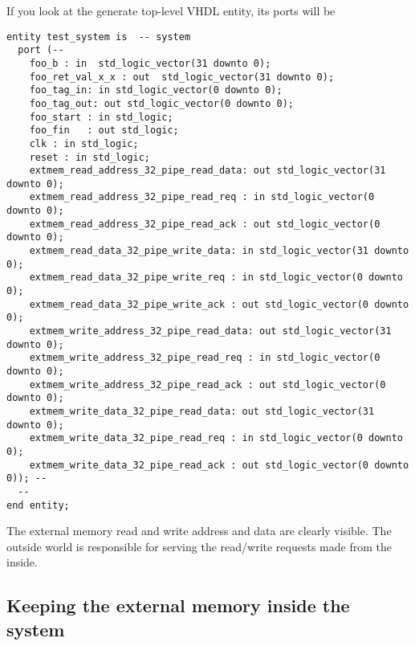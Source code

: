 \documentclass{article}
\begin{document}
If you look at the generate top-level VHDL entity, its ports
will be
\begin{verbatim}
entity test_system is  -- system
  port (--
    foo_b : in  std_logic_vector(31 downto 0);
    foo_ret_val_x_x : out  std_logic_vector(31 downto 0);
    foo_tag_in: in std_logic_vector(0 downto 0);
    foo_tag_out: out std_logic_vector(0 downto 0);
    foo_start : in std_logic;
    foo_fin   : out std_logic;
    clk : in std_logic;
    reset : in std_logic;
    extmem_read_address_32_pipe_read_data: out std_logic_vector(31 downto 0);
    extmem_read_address_32_pipe_read_req : in std_logic_vector(0 downto 0);
    extmem_read_address_32_pipe_read_ack : out std_logic_vector(0 downto 0);
    extmem_read_data_32_pipe_write_data: in std_logic_vector(31 downto 0);
    extmem_read_data_32_pipe_write_req : in std_logic_vector(0 downto 0);
    extmem_read_data_32_pipe_write_ack : out std_logic_vector(0 downto 0);
    extmem_write_address_32_pipe_read_data: out std_logic_vector(31 downto 0);
    extmem_write_address_32_pipe_read_req : in std_logic_vector(0 downto 0);
    extmem_write_address_32_pipe_read_ack : out std_logic_vector(0 downto 0);
    extmem_write_data_32_pipe_read_data: out std_logic_vector(31 downto 0);
    extmem_write_data_32_pipe_read_req : in std_logic_vector(0 downto 0);
    extmem_write_data_32_pipe_read_ack : out std_logic_vector(0 downto 0)); --
  --
end entity;
\end{verbatim}
The external memory read and write address and data are clearly
visible.   The outside world is responsible for serving the
read/write requests made from the inside.

\subsection{Keeping the external memory inside the system}
\end{document}
